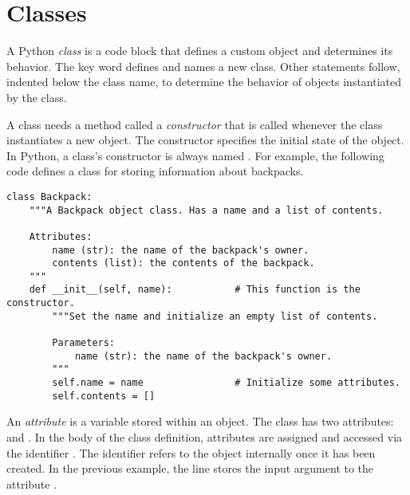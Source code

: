 \labdependencies{}
\label{lab:OOP}

\section*{Classes} %

A Python \emph{class} is a code block that defines a custom object and determines its behavior.
The  key word defines and names a new class.
Other statements follow, indented below the class name, to determine the behavior of objects instantiated by the class.

A class needs a method called a \emph{constructor} that is called whenever the class instantiates a new object.
The constructor specifies the initial state of the object.
In Python, a class's constructor is always named .
For example, the following code defines a class for storing information about backpacks.

\begin{lstlisting}
class Backpack:
    """A Backpack object class. Has a name and a list of contents.

    Attributes:
        name (str): the name of the backpack's owner.
        contents (list): the contents of the backpack.
    """
    def __init__(self, name):           # This function is the constructor.
        """Set the name and initialize an empty list of contents.

        Parameters:
            name (str): the name of the backpack's owner.
        """
        self.name = name                # Initialize some attributes.
        self.contents = []
\end{lstlisting}

An \emph{attribute} is a variable stored within an object.
The  class has two attributes:  and .
In the body of the class definition, attributes are assigned and accessed via the identifier .
The identifier  refers to the object internally once it has been created.
In the previous example, the line  stores the input argument  to the attribute .

